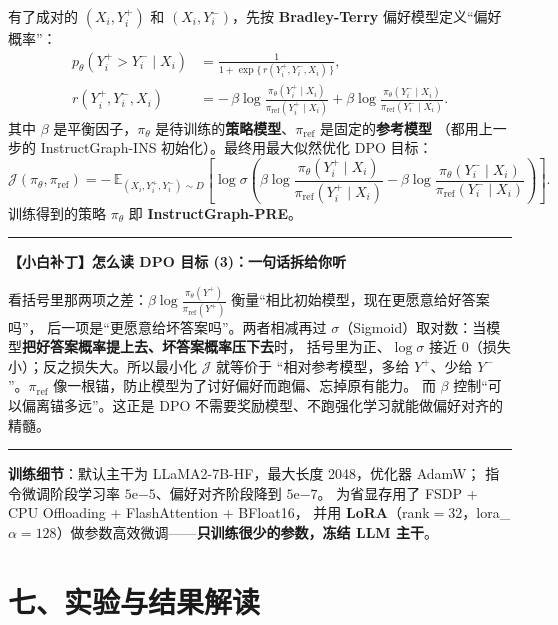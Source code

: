 \documentclass[11pt,UTF8,fontset=fandol]{ctexart}
\newenvironment{tip}[1]{%
  \par\smallskip\noindent\rule{\linewidth}{0.4pt}\par\nobreak
  \noindent\textbf{【小白补丁】#1}\par\nobreak\noindent\ignorespaces
}{%
  \par\noindent\rule{\linewidth}{0.4pt}\par\smallskip
}
\begin{document}
有了成对的 $(X_i, Y_i^+)$ 和 $(X_i, Y_i^-)$，先按 \textbf{Bradley-Terry} 偏好模型定义“偏好概率”：
\begin{equation*}
\begin{aligned}
  p_\theta(Y_i^+ > Y_i^- \mid X_i) &= \frac{1}{1+\exp\{\,r(Y_i^+,Y_i^-,X_i)\,\}}, \\
  r(Y_i^+,Y_i^-,X_i) &= -\,\beta\log\frac{\pi_\theta(Y_i^+\mid X_i)}{\pi_{\mathrm{ref}}(Y_i^+\mid X_i)}
  + \beta\log\frac{\pi_\theta(Y_i^-\mid X_i)}{\pi_{\mathrm{ref}}(Y_i^-\mid X_i)}.
\end{aligned}\tag{2}
\end{equation*}
其中 $\beta$ 是平衡因子，$\pi_\theta$ 是待训练的\textbf{策略模型}、$\pi_{\mathrm{ref}}$ 是固定的\textbf{参考模型}
（都用上一步的 InstructGraph-INS 初始化）。最终用最大似然优化 DPO 目标：
\begin{equation*}
  \mathcal{J}(\pi_\theta,\pi_{\mathrm{ref}}) = -\,\mathbb{E}_{(X_i,Y_i^+,Y_i^-)\sim D}
  \left[\log\sigma\!\left(\beta\log\frac{\pi_\theta(Y_i^+\mid X_i)}{\pi_{\mathrm{ref}}(Y_i^+\mid X_i)}
  - \beta\log\frac{\pi_\theta(Y_i^-\mid X_i)}{\pi_{\mathrm{ref}}(Y_i^-\mid X_i)}\right)\right]. \tag{3}
\end{equation*}
训练得到的策略 $\pi_\theta$ 即 \textbf{InstructGraph-PRE}。

\begin{tip}{怎么读 DPO 目标 (3)：一句话拆给你听}
看括号里那两项之差：$\beta\log\frac{\pi_\theta(Y^+)}{\pi_{\mathrm{ref}}(Y^+)}$ 衡量“相比初始模型，现在更愿意给好答案吗”，
后一项是“更愿意给坏答案吗”。两者相减再过 $\sigma$（Sigmoid）取对数：当模型\textbf{把好答案概率提上去、坏答案概率压下去}时，
括号里为正、$\log\sigma$ 接近 0（损失小）；反之损失大。所以最小化 $\mathcal{J}$ 就等价于
“相对参考模型，多给 $Y^+$、少给 $Y^-$”。$\pi_{\mathrm{ref}}$ 像一根锚，防止模型为了讨好偏好而跑偏、忘掉原有能力。
而 $\beta$ 控制“可以偏离锚多远”。这正是 DPO 不需要奖励模型、不跑强化学习就能做偏好对齐的精髓。
\end{tip}

\textbf{训练细节}：默认主干为 LLaMA2-7B-HF，最大长度 2048，优化器 AdamW；
指令微调阶段学习率 $5\mathrm{e}{-5}$、偏好对齐阶段降到 $5\mathrm{e}{-7}$。
为省显存用了 FSDP + CPU Offloading + FlashAttention + BFloat16，
并用 \textbf{LoRA}（rank$=32$，lora\_$\alpha=128$）做参数高效微调——\textbf{只训练很少的参数，冻结 LLM 主干}。

\section{七、实验与结果解读}
\end{document}
